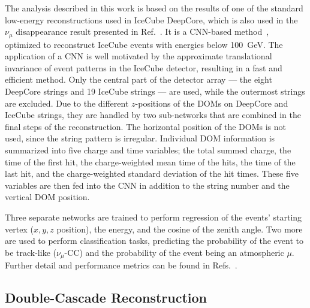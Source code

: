 \documentclass[
    aps,
    prd,
    reprint,
    amsmath,
    amssymb,
    nofootinbib,
    linenumbers,
    superscriptaddress,
    floatfix
]{revtex4-2}
\newcommand{\gev}{\giga\electronvolt}
\begin{document}
The analysis described in this work is based on the results of one of the standard low-energy reconstructions used in IceCube DeepCore, which is also used in the $\nu_{\mu}$ disappearance result presented in Ref.~\cite{IceCube:2024xjj}.
It is a CNN-based method~\cite{Micallef:2022jvd, flercnn_proceedings, flercnn}, optimized to reconstruct IceCube events with energies below \SI{100}{\gev}.
The application of a CNN is well motivated by the approximate translational invariance of event patterns in the IceCube detector, resulting in a fast and efficient method.
Only the central part of the detector array --- the eight DeepCore strings and 19 IceCube strings --- are used, while the outermost strings are excluded.
Due to the different $z$-positions of the DOMs on DeepCore and IceCube strings, they are handled by two sub-networks that are combined in the final steps of the reconstruction.
The horizontal position of the DOMs is not used, since the string pattern is irregular.
Individual DOM information is summarized into five charge and time variables; the total summed charge, the time of the first hit, the charge-weighted mean time of the hits, the time of the last hit, and the charge-weighted standard deviation of the hit times. These five variables are then fed into the CNN in addition to the string number and the vertical DOM position.

Three separate networks are trained to perform regression of the events' starting vertex ($x,y,z$ position), the energy, and the cosine of the zenith angle.
Two more are used to perform classification tasks, predicting the probability of the event to be track-like ($\nu_\mu$-CC) and the probability of the event being an atmospheric $\mu$. Further detail and performance metrics can be found in Refs.~\cite{Micallef:2022jvd, flercnn_proceedings}.


\subsection{\label{sec:taupede} Double-Cascade Reconstruction}
\end{document}
